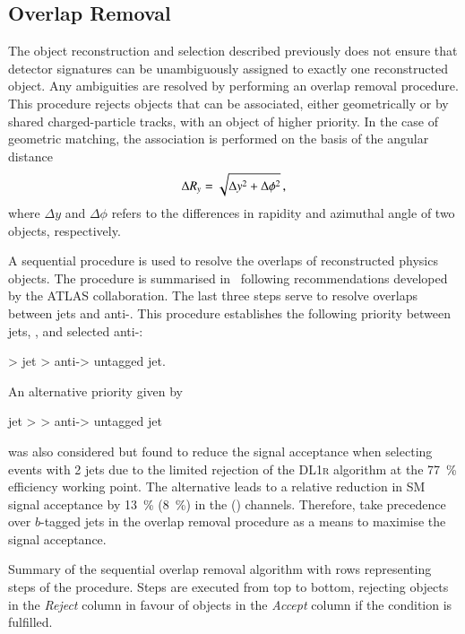 \subsection{Overlap Removal}%
\label{sec:overlap_removal}

The object reconstruction and selection described previously does not ensure
that detector signatures can be unambiguously assigned to exactly one
reconstructed object. Any ambiguities are resolved by performing an overlap
removal procedure. This procedure rejects objects that can be associated, either
geometrically or by shared charged-particle tracks, with an object of higher
priority. In the case of geometric matching, the association is performed on the
basis of the angular distance
\begin{align*}
  \Delta R_y = \sqrt{\Delta y^2 + \Delta \phi^2} \,\text{,}
\end{align*}
where $\Delta y$ and $\Delta \phi$ refers to the differences in rapidity and
azimuthal angle of two objects, respectively.

A sequential procedure is used to resolve the overlaps of reconstructed physics
objects. The procedure is summarised in~ following
recommendations developed by the ATLAS collaboration. The last three steps serve
to resolve overlaps between jets and anti-\tauhadvis. This procedure establishes
the following priority between jets, \tauhadvis, and selected anti-\tauhadvis:
\begin{center}
  \tauhadvis > \btagged jet > anti-\tauhadvis > untagged jet.
\end{center}
An alternative priority given by
\begin{center}
  \btagged jet > \tauhadvis > anti-\tauhadvis > untagged jet
\end{center}
was also considered but found to reduce the signal acceptance when selecting
events with 2 \btagged jets due to the limited \tauhadvis rejection of the
\textsc{DL1r} \btag algorithm at the \SI{77}{\percent} efficiency working
point. The alternative leads to a relative reduction in SM \HH signal acceptance
by \SI{13}{\percent} (\SI{8}{\percent}) in the \hadhad (\lephad)
channels. Therefore, \tauhadvis take precedence over $b$-tagged jets in the
overlap removal procedure as a means to maximise the signal acceptance.

\begin{table}[htbp]
  \centering


  \caption[Summary of the sequential overlap removal algorithm.]{Summary of the
    sequential overlap removal algorithm with rows representing steps of the
    procedure. Steps are executed from top to bottom, rejecting objects in the
    \emph{Reject} column in favour of objects in the \emph{Accept} column if the
    condition is fulfilled.}%
  \label{tab:overlap_removal}

  \resizebox{\textwidth}{!}{%
    
  }
\end{table}

